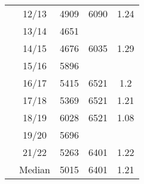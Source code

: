 \begin{longtable}[c]{p{5cm}cccc}
                                             & 12/13 & 4909 & 6090 & 1.24 \\ 
                                             & 13/14 & 4651 & ~ & ~ \\ 
                                             & 14/15 & 4676 & 6035 & 1.29 \\ 
                                             & 15/16 & 5896 & ~ & ~ \\ 
                                             & 16/17 & 5415 & 6521 & 1.2 \\ 
                                             & 17/18 & 5369 & 6521 & 1.21 \\ 
                                             & 18/19 & 6028 & 6521 & 1.08 \\ 
                                             & 19/20 & 5696 & ~ & ~ \\ 
                                             & 21/22 & 5263 & 6401 & 1.22 \\ 
                                             \cmidrule{2-5}
                                             & Median & 5015 & 6401 & 1.21 \\
                                             \bottomrule
\end{longtable}                                                    

\newpage

